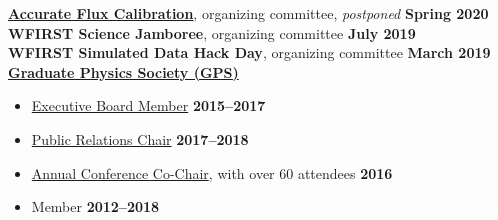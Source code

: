 \documentclass[margin]{res}
\begin{document}
\begin{resume}
\textbf{\href{https://www.stsci.edu/contents/events/stsci/2020/march/accurate-flux-calibration-for-21st-century-astrophysics?timeframe=}{Accurate Flux Calibration}}, organizing committee, \textit{postponed} \hfill \textbf{Spring 2020}\\
\textbf{WFIRST Science Jamboree}, organizing committee \hfill \textbf{July 2019}\\
\textbf{WFIRST Simulated Data Hack Day}, organizing committee \hfill \textbf{March 2019}\\
\textbf{\href{gradphysics.nd.edu}{Graduate Physics Society (GPS)}}
\begin{itemize}\itemsep -2pt
    \item[] \href{http://gradphysics.nd.edu/about-us/executive-board/}{Executive Board Member} \hfill {\bf 2015--2017}
    \item[] \href{http://gradphysics.nd.edu/about-us/committee-chairs/}{Public Relations Chair} \hfill {\bf 2017--2018}
    \item[] \href{http://gradphysics.nd.edu/conference/gpsac-2016/}{Annual Conference Co-Chair}, with over 60 attendees \hfill {\bf 2016}
    \item[] Member \hfill {\bf 2012--2018}
\end{itemize} \vspace{-12pt}

\end{resume}
\end{document}
